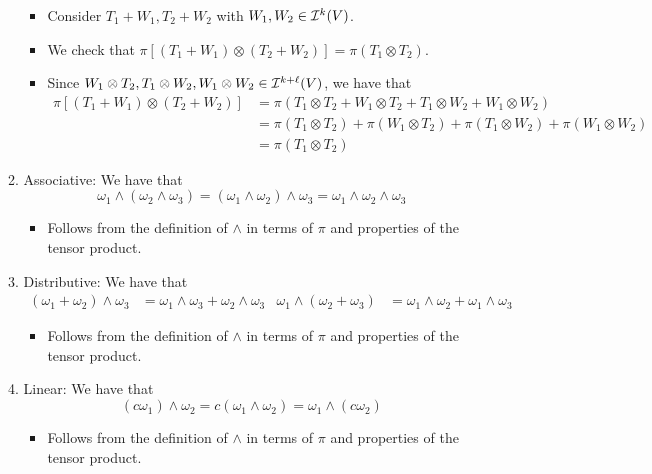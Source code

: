 \documentclass[../notes.tex]{subfiles}
\begin{document}
\begin{itemize}
\begin{enumerate}
\begin{itemize}
            \item Consider $T_1+W_1,T_2+W_2$ with $W_1,W_2\in\ide[k]{V}$.
            \item We check that $\pi[(T_1+W_1)\otimes(T_2+W_2)]=\pi(T_1\otimes T_2)$.
            \item Since $W_1\otimes T_2,T_1\otimes W_2,W_1\otimes W_2\in\ide[k+\ell]{V}$, we have that
            \begin{align*}
                \pi[(T_1+W_1)\otimes(T_2+W_2)] &= \pi(T_1\otimes T_2+W_1\otimes T_2+T_1\otimes W_2+W_1\otimes W_2)\\
                &= \pi(T_1\otimes T_2)+\pi(W_1\otimes T_2)+\pi(T_1\otimes W_2)+\pi(W_1\otimes W_2)\\
                &= \pi(T_1\otimes T_2)
            \end{align*}
        \end{itemize}
        \item Associative: We have that
        \begin{equation*}
            \omega_1\wedge(\omega_2\wedge\omega_3)=(\omega_1\wedge\omega_2)\wedge\omega_3=\omega_1\wedge\omega_2\wedge\omega_3
        \end{equation*}
        \begin{itemize}
            \item Follows from the definition of $\wedge$ in terms of $\pi$ and properties of the tensor product.
        \end{itemize}
        \item Distributive: We have that
        \begin{align*}
            (\omega_1+\omega_2)\wedge\omega_3 &= \omega_1\wedge\omega_3+\omega_2\wedge\omega_3&
            \omega_1\wedge(\omega_2+\omega_3) &= \omega_1\wedge\omega_2+\omega_1\wedge\omega_3
        \end{align*}
        \begin{itemize}
            \item Follows from the definition of $\wedge$ in terms of $\pi$ and properties of the tensor product.
        \end{itemize}
        \item Linear: We have that
        \begin{equation*}
            (c\omega_1)\wedge\omega_2 = c(\omega_1\wedge\omega_2)
            = \omega_1\wedge(c\omega_2)
        \end{equation*}
        \begin{itemize}
            \item Follows from the definition of $\wedge$ in terms of $\pi$ and properties of the tensor product.

\end{itemize}
\end{enumerate}
\end{itemize}
\end{document}
